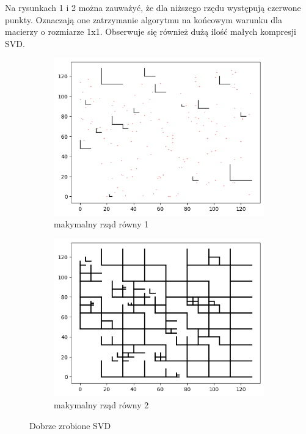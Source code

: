 \documentclass{article}
\begin{document}
Na rysunkach 1 i 2 można zauważyć, że dla niższego rzędu występują czerwone punkty. Oznaczają one zatrzymanie algorytmu na końcowym warunku dla macierzy o rozmiarze 1x1. Obserwuje się również dużą ilość małych kompresji SVD.
\FloatBarrier
\begin{figure}[htbp]
  \centering
  \begin{subfigure}[b]{0.4\textwidth}
      \includegraphics[width=\linewidth]{img/nice_one1.png}
      \caption{makymalny rząd równy 1}
      \label{fig:obraz1}
  \end{subfigure}
  \hfill
  \begin{subfigure}[b]{0.4\textwidth}
      \includegraphics[width=\linewidth]{img/nice_one2.png}
      \caption{makymalny rząd równy 2}
      \label{fig:obraz2}
  \end{subfigure}
  \caption{Dobrze zrobione SVD}
  \label{fig:zestaw_obrazkow}
\end{figure}
\end{document}
